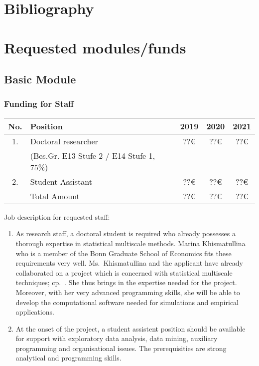 \documentclass[a4paper,12pt]{article}
\begin{document}
\section{Bibliography}

\vspace{-1cm}

\renewcommand\refname{}

{\small
\setlength{\bibsep}{0.55em}
}



\section{Requested modules/funds}


\subsection{Basic Module}


\subsubsection{Funding for Staff}

\begin{center}
\begin{tabular}{c l c c c}
No. & Position & 2019 & 2020 & 2021 \\
\hline 
1.  & Doctoral researcher & ??\euro{} & ??\euro{} & ??\euro{} \\
    & (Bes.Gr. E13 Stufe 2 / E14 Stufe 1, 75\%) & & & \\
2.  & Student Assistant   & ??\euro{} & ??\euro{} & ??\euro{} \\
\hline
    & Total Amount        & ??\euro{} & ??\euro{} & ??\euro{} \\
\end{tabular}
\end{center}

\noindent Job description for requested staff: 
\begin{enumerate}[leftmargin=0.5cm]
\item As research staff, a doctoral student is required who already possesses a thorough expertise in statistical multiscale methods. Marina Khismatullina who is a member of the Bonn Graduate School of Economics fits these requirements very well. Ms.\ Khismatullina and the applicant have already collaborated on a project which is concerned with statistical multiscale techniques; cp.\ \cite{KhismatullinaVogt2018}. She thus brings in the expertise needed for the project. Moreover, with her very advanced programming skills, she will be able to develop the computational software needed for simulations and empirical applications. 
\item At the onset of the project, a student assistent position should be available for support with exploratory data analysis, data mining, auxiliary programming and organisational issues. The prerequisities are strong analytical and programming skills.
\end{enumerate}
\end{document}
